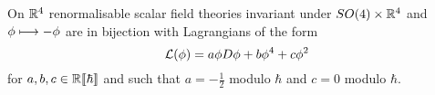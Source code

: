 \begin{corollary}
  On $\mathbb{R}^4$ renormalisable scalar field theories invariant under $SO(4) \times \mathbb{R}^4$ and $\phi \lmap -\phi$ are in bijection with Lagrangians of the form
  \begin{equation}\LL (\phi) = a \phi D \phi + b \phi^4 + c \phi^2\end{equation}
  for $a,b,c \in \mathbb{R}\llbracket\hbar \rrbracket$ and such that $a = - \frac{1}{2}$ modulo $\hbar$ and $c = 0$ modulo $\hbar$.
\end{corollary}




\newpage
